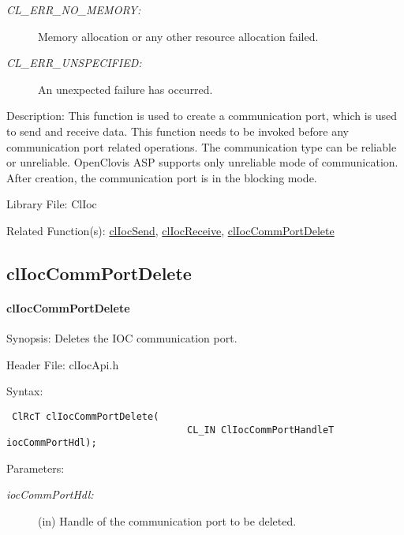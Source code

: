 \begin{flushleft}
\begin{Desc}
\begin{description}
\item[{\em CL\_\-ERR\_\-NO\_\-MEMORY:}]Memory allocation or any other resource allocation failed. 
\item[{\em CL\_\-ERR\_\-UNSPECIFIED:}]An unexpected failure has occurred.\end{description}
\end{Desc}
\begin{Desc}
\item[Description:]This function is used to create a communication port, which is used to send and receive data. This function needs to be invoked before
any communication port related operations. The communication type can be reliable or unreliable. Open\-Clovis ASP supports only unreliable mode of 
communication. After creation, the communication port is in the blocking mode.\end{Desc}
\begin{Desc}
\item[Library File:]Cl\-Ioc\end{Desc}
\begin{Desc}
\item[Related Function(s):]\hyperlink{pageioc104}{cl\-Ioc\-Send}, \hyperlink{pageioc105}{cl\-Ioc\-Receive}, 
\hyperlink{pageioc103}{cl\-Ioc\-Comm\-Port\-Delete} \end{Desc}
\newpage


\subsection{clIocCommPortDelete}
\hypertarget{pageioc103}{}\paragraph{cl\-Ioc\-Comm\-Port\-Delete}\label{pageioc103}
\begin{Desc}
\item[Synopsis:]Deletes the IOC communication port.\end{Desc}
\begin{Desc}
\item[Header File:]clIocApi.h\end{Desc}
\begin{Desc}
\item[Syntax:]

\footnotesize\begin{verbatim} ClRcT clIocCommPortDelete(
                      			CL_IN ClIocCommPortHandleT iocCommPortHdl);
\end{verbatim}
\normalsize
\end{Desc}
\begin{Desc}
\item[Parameters:]
\begin{description}
\item[{\em ioc\-Comm\-Port\-Hdl:}](in) Handle of the communication port to be deleted.\end{description}
\end{Desc}



\end{flushleft}
